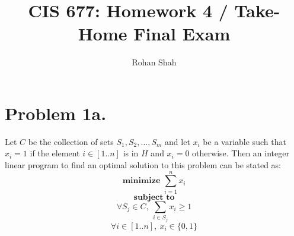 \documentclass[12pt]{article}
\begin{document}
\pagestyle{plain}
\titleformat{\subsection}[runin]
  {\normalfont\large\bfseries}{\thesubsection}{1em}{}
\titleformat{\subsubsection}[runin]
  {\normalfont\large\bfseries}{\thesubsubsection}{1em}{}

\title{CIS 677: Homework 4 / Take-Home Final Exam}
\author{Rohan Shah}
\date{}

\maketitle

\section*{Problem 1a.}
Let $C$ be the collection of sets $S_1, S_2, ...,S_m$ and let $x_i$ be a
variable such that $x_i = 1$ if the element $i \in [1..n]$ is in $H$ and
$x_i = 0$ otherwise. Then an integer linear program to find an optimal solution
to this problem can be stated as:
$$ \textbf{minimize } \sum_{i=1}^n x_i $$
$$ \textbf{ subject to } $$
$$ \forall S_j \in C,\ \sum_{i \in S_j} x_i \ge 1 $$
$$ \forall i \in [1..n],\ x_i \in \{0,1\} $$
\end{document}
